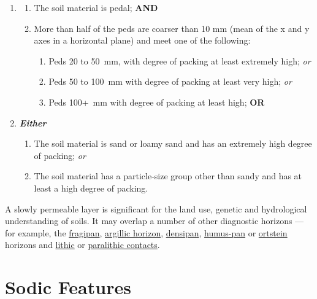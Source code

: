 \documentclass[
  letterpaper,
  DIV=11,
  numbers=noendperiod]{scrreprt}
\providecommand{\tightlist}{%
  \setlength{\itemsep}{0pt}\setlength{\parskip}{0pt}}\usepackage{longtable,booktabs,array}
\begin{document}
\begin{enumerate}
\def\labelenumi{\arabic{enumi}.}
\item
  \begin{enumerate}
  \def\labelenumii{(\alph{enumii})}
  \tightlist
  \item
    The soil material is pedal; \textbf{AND}
  \item
    More than half of the peds are coarser than 10 mm (mean of the x and
    y axes in a horizontal plane) and meet one of the following:

    \begin{enumerate}
    \def\labelenumiii{(\roman{enumiii})}
    \tightlist
    \item
      Peds 20 to 50~mm, with degree of packing at least extremely high;
      \emph{or}
    \item
      Peds 50 to 100~mm with degree of packing at least very high;
      \emph{or}
    \item
      Peds 100+~mm with degree of packing at least high; \textbf{OR}
    \end{enumerate}
  \end{enumerate}
\item
  \textbf{\emph{Either}}

  \begin{enumerate}
  \def\labelenumii{(\alph{enumii})}
  \tightlist
  \item
    The soil material is sand or loamy sand and has an extremely high
    degree of packing; \emph{or}
  \item
    The soil material has a particle-size group other than sandy and has
    at least a high degree of packing.
  \end{enumerate}
\end{enumerate}

A slowly permeable layer is significant for the land use, genetic and
hydrological understanding of soils. It may overlap a number of other
diagnostic horizons --- for example, the
\protect\hyperlink{sec-diag-fpan}{fragipan},
\protect\hyperlink{sec-diag-argh}{argillic horizon},
\protect\hyperlink{sec-diag-dens}{densipan},
\protect\hyperlink{sec-diag-hpan}{humus-pan} or
\protect\hyperlink{sec-diag-opan}{ortstein} horizons and
\protect\hyperlink{sec-diag-lithc}{lithic} or
\protect\hyperlink{sec-diag-plith}{paralithic contacts}.

\hypertarget{sec-diag-sod}{%
\section{Sodic Features}\label{sec-diag-sod}}
\end{document}
